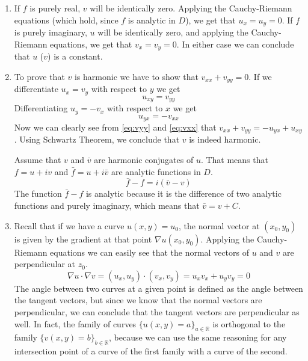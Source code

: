 \documentclass{article}
\def\R{\mathbb{R}}
\begin{document}
    \begin{enumerate}[label=(\alph*)]
        \item If $f$ is purely real, $v$ will be identically zero. Applying the Cauchy-Riemann equations (which hold, since $f$ is analytic in $D$), we get that $u_x = u_y = 0$.  If $f$ is purely imaginary, $u$ will be identically zero, and applying the Cauchy-Riemann equations, we get that $v_x = v_y = 0$. In either case we can conclude that $u$ ($v$) is a constant.
        \item To prove that $v$ is harmonic we have to show that $v_{xx} + v_{yy} = 0$. If we differentiate $u_x = v_y$ with respect to $y$ we get
        \begin{equation}
            \label{eq:vyy}
            u_{xy} = v_{yy}
        \end{equation}
        Differentiating $u_y = -v_x$ with respect to $x$ we get
        \begin{equation}
            \label{eq:vxx}
            u_{yx} = -v_{xx}
        \end{equation}
        Now we can clearly see from \eqref{eq:vyy} and \eqref{eq:vxx} that $v_{xx} + v_{yy} = -u_{yx} + u_{xy}$. Using Schwartz Theorem, we conclude that $v$ is indeed harmonic. \par
        Assume that $v$ and $\bar{v}$ are harmonic conjugates of $u$. That means that $f = u + iv$ and $\bar{f} = u + i\bar{v}$ are analytic functions in $D$.
        \begin{equation*}
            \bar{f} - f = i(\bar{v} - v)
        \end{equation*}
        The function $\bar{f} - f$ is analytic because it is the difference of two analytic functions and purely imaginary, which means that $\bar{v} = v + C$.
        \item Recall that if we have a curve $u(x, y) = u_0$, the normal vector at $(x_0, y_0)$ is given by the gradient at that point $\nabla u (x_0, y_0)$. Applying the Cauchy-Riemann equations we can easily see that the normal vectors of $u$ and $v$ are perpendicular at $z_0$.
        \begin{equation*}
            \nabla u \cdot \nabla v = (u_x, u_y) \cdot (v_x, v_y) = u_x v_x + u_y v_y = 0
        \end{equation*}
        The angle between two curves at a given point is defined as the angle between the tangent vectors, but since we know that the normal vectors are perpendicular, we can conclude that the tangent vectors are perpendicular as well. In fact, the family of curves $\{u(x, y) = a\}_{a \in \R}$ is orthogonal to the family $\{v(x, y) = b\}_{b \in \R}$, because we can use the same reasoning for any intersection point of a curve of the first family with a curve of the second.
    \end{enumerate}
\end{document}
